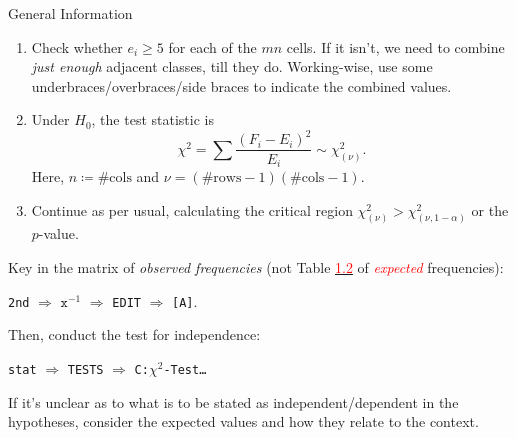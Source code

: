\documentclass[../Notes.tex]{subfiles}
\begin{document}
\begin{stbox}{General Information}
\begin{enumerate}
\begin{table}[H]
\begin{tabular}{ScSc|Sc|Sc|Sc|Sc|Sc}
      \end{tabular}
      \caption{\emph{Expected} frequencies for a test of independence.}
      \label{table:tests-of-indepedence}
    \end{table}
    \vspace{-1em}
    \begin{minipage}{0.825\textwidth}
      \begin{remark}
        The expected frequencies are given by \(e_{ij}=\dfrac{\text{row total}\cdot\text{column total}}{\text{total number of observations}}=\dfrac{t_{r_i}t_{c_j}}{S}\).
      \end{remark}
    \end{minipage}
    \item Check whether \(e_i\geq 5\) for each of the \(mn\) cells. If it isn't, we need to combine \emph{just enough} adjacent classes, till they do. Working-wise, use some underbraces/overbraces/side braces to indicate the combined values. 
    \item Under \(H_0\), the test statistic is
    \[\chi^2=\sum{\frac{(F_i-E_i)^2}{E_i}}\sim\chi_{(\nu)}^2.\]
    Here, \(n\coloneq\#\text{cols}\) and \(\nu=(\#\text{rows}-1)(\#\text{cols}-1)\).
    \item Continue as per usual, calculating the critical region \(\chi_{(\nu)}^2>\chi^2_{(\nu,1-\alpha)}\) or the \(p\)-value.
  \end{enumerate}
\end{stbox}
\begin{GCSkills}{}
  Key in the matrix of \emph{\textcolor{green!70!black}{observed} frequencies} (not Table \hyperlink{table:tests-of-indepedence}{\textcolor{red}{1.2}} of \emph{\textcolor{red}{expected}} frequencies): 
  \begin{center}
    \texttt{2nd} \(\Longrightarrow\) \(\texttt{x}^{-1}\) \(\Longrightarrow\) \texttt{EDIT} \(\Longrightarrow\) \texttt{[A]}.
  \end{center}
  Then, conduct the test for independence:
  \begin{center}
    \texttt{stat} \(\Longrightarrow\) \texttt{TESTS} \(\Longrightarrow\) \texttt{C:\(\chi^2\)-Test\dots}
  \end{center}
\end{GCSkills}
\begin{note}
  If it's unclear as to what is to be stated as independent/dependent in the hypotheses, consider the expected values and how they relate to the context.  
\end{note}
\end{document}

